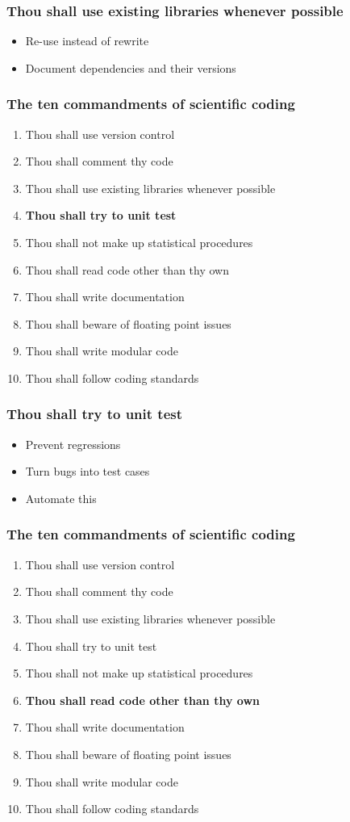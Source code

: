 \documentclass[slidestop]{beamer}
\begin{document}
\begin{frame}
  \frametitle{Thou shall use existing libraries whenever possible}
  \begin{itemize}
    \item Re-use instead of rewrite
    \item Document dependencies and their versions
  \end{itemize}
\end{frame}

\begin{frame}
  \frametitle{The ten commandments of scientific coding}
  \begin{enumerate}
    \item Thou shall use version control
    \item Thou shall comment thy code
    \item Thou shall use existing libraries whenever possible
    \item {\bf Thou shall try to unit test}
    \item Thou shall not make up statistical procedures
    \item Thou shall read code other than thy own
    \item Thou shall write documentation
    \item Thou shall beware of floating point issues
    \item Thou shall write modular code
    \item Thou shall follow coding standards
  \end{enumerate}
\end{frame}

\begin{frame}
  \frametitle{Thou shall try to unit test}
  \begin{itemize}
    \item Prevent regressions
    \item Turn bugs into test cases
    \item Automate this
  \end{itemize}
\end{frame}

\begin{frame}
  \frametitle{The ten commandments of scientific coding}
  \begin{enumerate}
    \item Thou shall use version control
    \item Thou shall comment thy code
    \item Thou shall use existing libraries whenever possible
    \item Thou shall try to unit test
    \item Thou shall not make up statistical procedures
    \item {\bf Thou shall read code other than thy own}
    \item Thou shall write documentation
    \item Thou shall beware of floating point issues
    \item Thou shall write modular code
    \item Thou shall follow coding standards
  \end{enumerate}
\end{frame}
\end{document}
